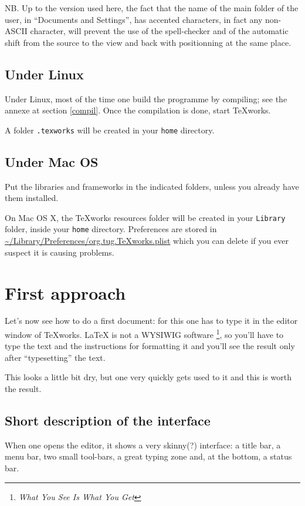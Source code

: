 \documentclass[11pt]{article}
\begin{document}
NB. Up to the version used here, the fact that the name of the main folder of the user, in ``Documents and Settings'', has accented characters, in fact any non-ASCII character, will prevent the use of the spell-checker and of the automatic shift from the source to the view and back with positionning at the same place.

\subsection{Under Linux}

Under Linux, most of the time one build the programme by compiling; see the annexe at section \ref{compil}. Once the compilation is done, start \TeX works.

A folder \verb=.texworks= will be created in your \verb=home= directory.

\subsection{Under Mac OS}

Put the libraries and frameworks in the indicated folders, unless you already have them installed. 

On Mac OS X, the \TeX works resources folder will be created in your \verb=Library= folder, inside your \verb=home= directory. Preferences are stored in \url{ ~/Library/Preferences/org.tug.TeXworks.plist}
which you can delete if you ever suspect it is causing problems.

\section{First approach}

Let's now see how to do a first document: for this one has to type it in the editor window of \TeX works. \LaTeX{} is not a WYSIWIG software \footnote{\emph{What You See Is What You Get}}, so you'll have to type the text and the instructions for formatting it and you'll see the result only after ``typesetting'' the text.

This looks a little bit dry, but one very quickly gets used to it and this is worth the result.

\subsection{Short description of the interface}

When one opens the editor, it shows a very skinny(?) interface: a title bar, a menu bar, two small tool-bars, a great typing zone and, at the bottom, a status bar.
\vspace{10pt}
\end{document}
